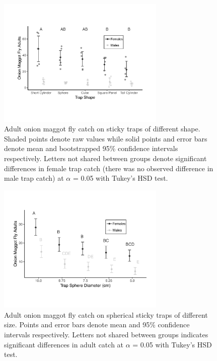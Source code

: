 \documentclass[alpha-refs]{wiley-article}
\begin{document}
\begin{figure}[bt]
\centering
\includegraphics[width = 8cm]{figures/publication/figure-1.pdf}
\caption{Adult onion maggot fly catch on sticky traps of different shape.  Shaded points denote raw values while solid points and error bars denote mean and bootstrapped 95\% confidence intervals respectively.  Letters not shared between groups denote significant differences in female trap catch (there was no observed difference in male trap catch) at $\alpha$ = 0.05 with Tukey's HSD test. }
\label{fig:figure1}
\end{figure}

\begin{figure}[bt]
\centering
\includegraphics[width = 8cm]{figures/publication/figure-2.pdf}
\caption{Adult onion maggot fly catch on spherical sticky traps of different size.  Points and error bars denote mean and 95\% confidence intervals respectively.  Letters not shared between groups indicates significant differences in adult catch at $\alpha$ = 0.05 with Tukey's HSD test.}
\label{fig:figure2}
\end{figure}
\end{document}
